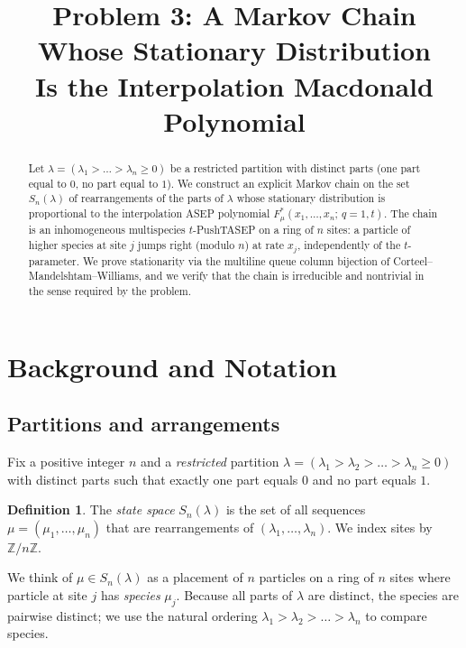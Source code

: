 \documentclass[12pt]{article}
\title{Problem 3: A Markov Chain Whose Stationary Distribution\\
Is the Interpolation Macdonald Polynomial}
\author{}
\date{}
\theoremstyle{definition}
\newtheorem{definition}[theorem]{Definition}
\begin{document}
\maketitle

\begin{abstract}
Let $\lambda = (\lambda_1 > \dots > \lambda_n \geq 0)$ be a restricted partition
with distinct parts (one part equal to $0$, no part equal to $1$).  We construct
an explicit Markov chain on the set $S_n(\lambda)$ of rearrangements of the parts
of $\lambda$ whose stationary distribution is proportional to the interpolation
ASEP polynomial $F^*_\mu(x_1,\dots,x_n;\,q{=}1,t)$.  The chain is an
inhomogeneous multispecies $t$-PushTASEP on a ring of $n$ sites: a particle of
higher species at site $j$ jumps right (modulo $n$) at rate $x_j$, independently
of the $t$-parameter.  We prove stationarity via the multiline queue column
bijection of Corteel--Mandelshtam--Williams, and we verify that the chain is
irreducible and nontrivial in the sense required by the problem.
\end{abstract}

\section{Background and Notation}

\subsection{Partitions and arrangements}

Fix a positive integer $n$ and a \emph{restricted} partition
$\lambda = (\lambda_1 > \lambda_2 > \dots > \lambda_n \geq 0)$ with distinct
parts such that exactly one part equals $0$ and no part equals $1$.

\begin{definition}
The \emph{state space} $S_n(\lambda)$ is the set of all sequences
$\mu = (\mu_1, \dots, \mu_n)$ that are rearrangements of $(\lambda_1, \dots,
\lambda_n)$.  We index sites by $\mathbb{Z}/n\mathbb{Z}$.
\end{definition}

We think of $\mu \in S_n(\lambda)$ as a placement of $n$ particles on a ring of
$n$ sites where particle at site $j$ has \emph{species} $\mu_j$.  Because all
parts of $\lambda$ are distinct, the species are pairwise distinct; we use the
natural ordering $\lambda_1 > \lambda_2 > \dots > \lambda_n$ to compare species.
\end{document}
